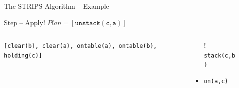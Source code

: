 \documentclass[presentation]{beamer}\mode<presentation>{\usetheme{AMSBolognaFC}}
\begin{document}
\begin{frame}[c]{The STRIPS Algorithm -- Example}
\small

\begin{exampleblock}{Step \nextStripsExampleStep{} -- Apply! \hfill $Plan = [\mathtt{unstack(c,a)}]$}
    \begin{columns}[t]
        \begin{column}{.30\linewidth}\centering
            \texttt{[clear(b), clear(a), ontable(a), ontable(b), holding(c)]}
        \end{column}
        \begin{column}{.50\linewidth}\centering
            \begin{itemize}
                \item[!] \texttt{stack(c,b)}
                \item \texttt{on(a,c)}
            \end{itemize}
        \end{column}
        \begin{column}{.10\linewidth}\centering
            
        \end{column}
    \end{columns}
\end{exampleblock}

\end{frame}



%             
\end{document}
